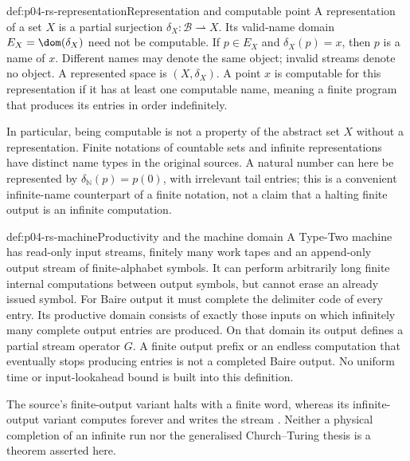\begin{hbdefinition}{def:p04-rs-representation}{Representation and computable point}
A representation of a set \(X\) is a partial surjection
\(\delta_X:\mathcal B\rightharpoonup X\).
Its valid-name domain \(E_X=\dom(\delta_X)\) need not be computable.
If \(p\in E_X\) and \(\delta_X(p)=x\), then \(p\) is a name of \(x\).
Different names may denote the same object; invalid streams denote
no object. A represented space is \((X,\delta_X)\).
A point \(x\) is computable for this representation if it has at
least one computable name, meaning a finite program that produces
its entries in order indefinitely.
\end{hbdefinition}

In particular, being computable is not a property of the abstract
set \(X\) without a representation. Finite notations of countable
sets and infinite representations have distinct name types in the
original sources. A natural number can here be represented by
\(\delta_{\mathbb N}(p)=p(0)\), with irrelevant tail entries;
this is a convenient infinite-name counterpart of a finite notation,
not a claim that a halting finite output is an infinite computation.

\begin{hbdefinition}{def:p04-rs-machine}{Productivity and the machine domain}
A Type-Two machine has read-only input streams, finitely many work
tapes and an append-only output stream of finite-alphabet symbols.
It can perform arbitrarily long finite internal computations between
output symbols, but cannot erase an already issued symbol.
For Baire output it must complete the delimiter code of every entry.
Its productive domain consists of exactly those inputs on which
infinitely many complete output entries are produced.
On that domain its output defines a partial stream operator \(G\).
A finite output prefix or an endless computation that eventually
stops producing entries is not a completed Baire output.
No uniform time or input-lookahead bound is built into this definition.
\end{hbdefinition}

The source's finite-output variant halts with a finite word,
whereas its infinite-output variant computes forever and writes
the stream \cite[Definitions 2.1--2.3]{Weihrauch1995IntroductionRS}.
Neither a physical completion of an infinite run nor the
generalised Church--Turing thesis is a theorem asserted here.

